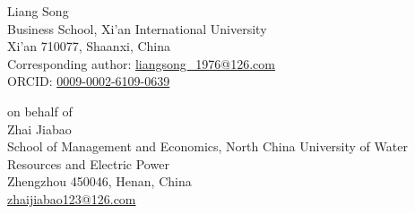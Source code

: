 \documentclass[11pt]{article}
\begin{document}
Liang Song\\
Business School, Xi'an International University\\
Xi'an 710077, Shaanxi, China\\
Corresponding author: \href{mailto:liangsong_1976@126.com}{liangsong\_1976@126.com}\\
ORCID: \href{https://orcid.org/0009-0002-6109-0639}{0009-0002-6109-0639}

on behalf of\\
Zhai Jiabao\\
School of Management and Economics, North China University of Water Resources
and Electric Power\\
Zhengzhou 450046, Henan, China\\
\href{mailto:zhaijiabao123@126.com}{zhaijiabao123@126.com}
\end{document}
